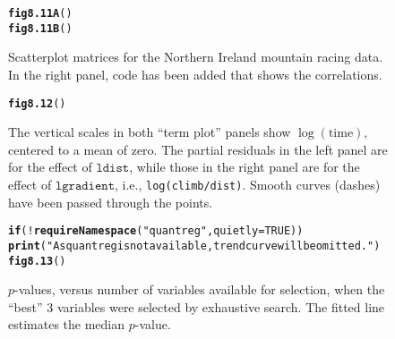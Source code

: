 \documentclass[12pt, a4paper,  BCOR=8.25mm, DIV=15]{scrartcl}\usepackage[]{graphicx}\usepackage[]{color}
\makeatletter
\newcommand{\hlnum}[1]{\textcolor[rgb]{0.686,0.059,0.569}{#1}}%
\newcommand{\hlstr}[1]{\textcolor[rgb]{0.192,0.494,0.8}{#1}}%
\newcommand{\hlopt}[1]{\textcolor[rgb]{0,0,0}{#1}}%
\newcommand{\hlstd}[1]{\textcolor[rgb]{0.345,0.345,0.345}{#1}}%
\newcommand{\hlkwa}[1]{\textcolor[rgb]{0.161,0.373,0.58}{\textbf{#1}}}%
\newcommand{\hlkwc}[1]{\textcolor[rgb]{0.333,0.667,0.333}{#1}}%
\newcommand{\hlkwd}[1]{\textcolor[rgb]{0.737,0.353,0.396}{\textbf{#1}}}%
\newenvironment{kframe}{%
 \def\at@end@of@kframe{}%
 \ifinner\ifhmode%
  \def\at@end@of@kframe{\end{minipage}}%
  \begin{minipage}{\columnwidth}%
 \fi\fi%
 \def\FrameCommand##1{\hskip\@totalleftmargin \hskip-\fboxsep
 \colorbox{shadecolor}{##1}\hskip-\fboxsep
     \hskip-\linewidth \hskip-\@totalleftmargin \hskip\columnwidth}%
 \MakeFramed {\advance\hsize-\width
   \@totalleftmargin\z@ \linewidth\hsize
   \@setminipage}}%
 {\par\unskip\endMakeFramed%
 \at@end@of@kframe}
\newenvironment{knitrout}{}{} %
\newcommand{\txtt}[1]{{\texttt{#1}}}
\makeatother
\begin{document}
\begin{figure}[H]
\begin{knitrout}
\color{fgcolor}\begin{kframe}
\begin{alltt}
\hlkwd{fig8.11A}\hlstd{()}
\hlkwd{fig8.11B}\hlstd{()}
\end{alltt}
\end{kframe}
\end{knitrout}
\caption{Scatterplot matrices for the Northern Ireland mountain racing
  data. In the right panel, code has been added that shows the
  correlations.
\label{fig:nimra-reg}}
\end{figure}



\begin{figure}[H]
\begin{knitrout}
\color{fgcolor}\begin{kframe}
\begin{alltt}
\hlkwd{fig8.12}\hlstd{()}
\end{alltt}
\end{kframe}
\end{knitrout}
\caption{The vertical scales in both ``term plot'' panels show
  $\log(\mbox{time})$, centered to a mean of zero. The partial residuals
  in the left panel are for the effect of $\txtt{ldist}$, while those
  in the right panel are for the effect of $\txtt{lgradient}$, i.e.,
  \txtt{log(climb/dist)}. Smooth curves (dashes) have been passed
  through the points.\label{fig:lnihills-lin}}
\vspace*{-15pt}
\end{figure}

\begin{figure}[H]
\begin{knitrout}
\color{fgcolor}\begin{kframe}
\begin{alltt}
\hlkwa{if}\hlstd{(}\hlopt{!}\hlkwd{requireNamespace}\hlstd{(}\hlstr{"quantreg"}\hlstd{,} \hlkwc{quietly}\hlstd{=}\hlnum{TRUE}\hlstd{))}
    \hlkwd{print}\hlstd{(}\hlstr{"As quantreg is not available, trend curve will be omitted."}\hlstd{)}
\hlkwd{fig8.13}\hlstd{()}
\end{alltt}
\end{kframe}
\end{knitrout}
\caption{$p$-values, versus number of variables available for selection,
  when the ``best'' 3 variables were selected by exhaustive search.
  The fitted line estimates the median $p$-value.\label{fig:exhaust}}
\end{figure}
\end{document}
